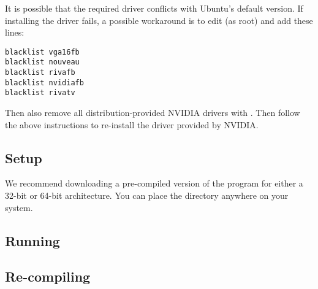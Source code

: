 It is possible that the required driver conflicts with Ubuntu's default version. If installing the driver fails, a possible workaround is to edit  (as root) and add these lines:
\small
\begin{verbatim}
blacklist vga16fb
blacklist nouveau
blacklist rivafb
blacklist nvidiafb
blacklist rivatv
\end{verbatim}
\normalsize

Then also remove all distribution-provided \textsc{NVIDIA} drivers with . Then follow the above instructions to re-install the driver provided by \textsc{NVIDIA}.


\subsection{Setup}

We recommend downloading a pre-compiled version of the program for either a 32-bit or 64-bit architecture. You can place the \prog directory anywhere on your system. 

\subsection{Running}

\subsection{Re-compiling}






